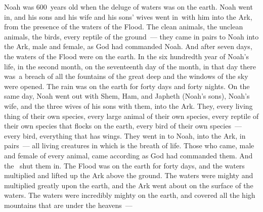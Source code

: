 \begin{inparaenum}
   Noah was 600~years old when the deluge of waters was on the earth.%
   Noah went in, and his sons and his wife and his sons' wives went in\understood\ with him into the Ark, from the presence of the waters of the Flood.%
   The clean animals, the unclean animals, the birds, every reptile of the ground~---%
   they came in pairs to Noah into the Ark, male and female, as God had commanded Noah.%
   And after seven days, the waters of the Flood were on the earth.%
   In the six hundredth year of Noah's life, in the second month, on the seventeenth day of the month, in that day there was\understood\ a breach of all the fountains of the great deep and the windows of the sky were opened.%
   The rain was on the earth for forty days and forty nights.%
   On the same day, Noah went out with Shem, Ham, and Japheth (Noah's sons), Noah's wife, and the three wives of his sons with them, into the Ark.%
   They, every living thing of their own species, every large animal of their own species, every reptile of their own species that flocks on the earth, every bird of their own species~--- every bird, everything that has wings.%
   They went in to Noah, into the Ark, in pairs~--- all living creatures in which is the breath of life.%
   Those who came, male and female of every animal, came according as God had commanded them. And the \lord\ shut them in.%
   The Flood was on the earth for forty days, and the waters multiplied and lifted up the Ark above the ground.%
   The waters were mighty and multiplied greatly upon the earth, and the Ark went about on the surface of the waters.%
   The waters were incredibly mighty on the earth, and covered all the high mountains that are under the heavens~---%

\end{inparaenum}
